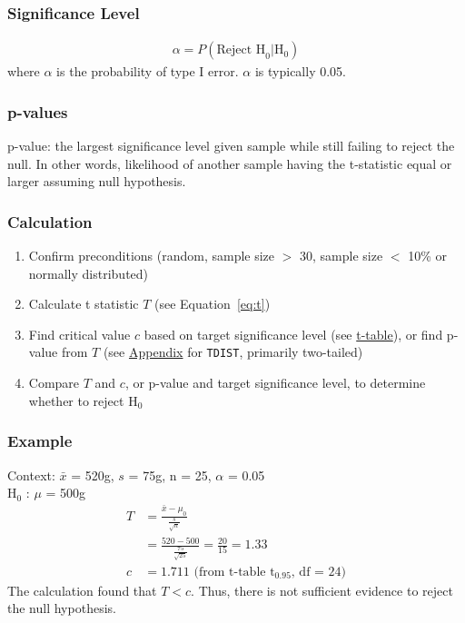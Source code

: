 \documentclass[12pt]{article}
\numberwithin{equation}{section}
\begin{document}
\subsubsection{Significance Level}
\begin{gather}
    \alpha = P(\text{Reject H}_0|\text{H}_0)
\end{gather}
where $\alpha$ is the probability of type I error. $\alpha$ is typically 0.05.

\subsubsection{p-values}
p-value: the largest significance level given sample while still failing to reject the null. In other words, likelihood of another sample having the t-statistic equal or larger assuming null hypothesis.

\subsubsection{Calculation}
\begin{enumerate}
    \item Confirm preconditions (random, sample size $>$ 30, sample size $<$ 10\% or normally distributed)
    \item Calculate t statistic $T$ (see Equation~\ref{eq:t})
    \item Find critical value $c$ based on target significance level (see \href{fig:t_table}{t-table}), or find p-value from $T$ (see \href{sec:appendix}{Appendix} for \verb|TDIST|, primarily two-tailed)
    \item Compare $T$ and $c$, or p-value and target significance level, to determine whether to reject H$_0$
\end{enumerate}

\subsubsection{Example}
Context: $\bar{x}$ = 520g, $s$ = 75g, n = 25, $\alpha$ = 0.05 \\
H$_0$ : $\mu$ = 500g
\begin{align}
    T &= \frac{\bar{x}-\mu_0}{\frac{s}{\sqrt{n}}} \label{eq:t} \\
    &= \frac{520-500}{\frac{75}{\sqrt{25}}} = \frac{20}{15} = 1.33 \\
    c &= 1.711 \text{ (from t-table t$_{0.95}$, df = 24)}
\end{align}
The calculation found that $T<c$. Thus, there is not sufficient evidence to reject the null hypothesis.
\end{document}
